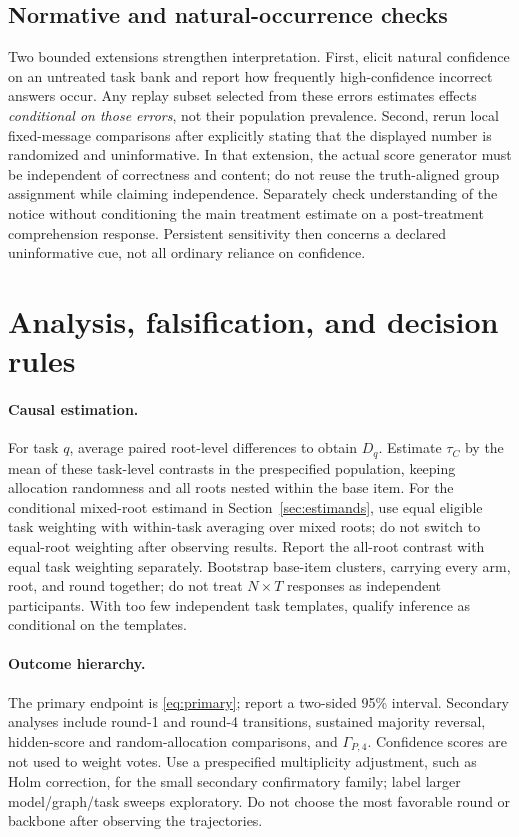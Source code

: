 \documentclass[11pt]{article}
\begin{document}
\subsection{Normative and natural-occurrence checks}
Two bounded extensions strengthen interpretation. First, elicit natural confidence on an untreated task bank and report how frequently high-confidence incorrect answers occur. Any replay subset selected from these errors estimates effects \emph{conditional on those errors}, not their population prevalence. Second, rerun local fixed-message comparisons after explicitly stating that the displayed number is randomized and uninformative. In that extension, the actual score generator must be independent of correctness and content; do not reuse the truth-aligned group assignment while claiming independence. Separately check understanding of the notice without conditioning the main treatment estimate on a post-treatment comprehension response. Persistent sensitivity then concerns a declared uninformative cue, not all ordinary reliance on confidence.

\section{Analysis, falsification, and decision rules}
\label{sec:analysis}
\paragraph{Causal estimation.}
For task $q$, average paired root-level differences to obtain $D_q$. Estimate $\tau_C$ by the mean of these task-level contrasts in the prespecified population, keeping allocation randomness and all roots nested within the base item. For the conditional mixed-root estimand in Section~\ref{sec:estimands}, use equal eligible task weighting with within-task averaging over mixed roots; do not switch to equal-root weighting after observing results. Report the all-root contrast with equal task weighting separately. Bootstrap base-item clusters, carrying every arm, root, and round together; do not treat $N\times T$ responses as independent participants. With too few independent task templates, qualify inference as conditional on the templates.

\paragraph{Outcome hierarchy.}
The primary endpoint is \eqref{eq:primary}; report a two-sided 95\% interval. Secondary analyses include round-1 and round-4 transitions, sustained majority reversal, hidden-score and random-allocation comparisons, and $\Gamma_{P,4}$. Confidence scores are not used to weight votes. Use a prespecified multiplicity adjustment, such as Holm correction, for the small secondary confirmatory family; label larger model/graph/task sweeps exploratory. Do not choose the most favorable round or backbone after observing the trajectories.
\end{document}
